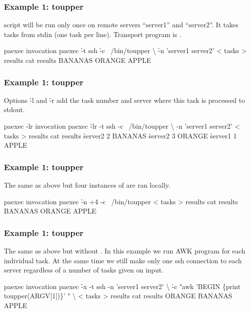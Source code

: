 \documentclass[hyperref={colorlinks=true}]{beamer}
\begin{document}
\begin{frame}[fragile]
  \frametitle{Example 1: toupper}
 script will be run only once on remote servers
``server1'' and ``server2''.  It takes tasks from stdin (one task per
line). Transport program is .
  \begin{block}{}
      \begin{CodeLarge}{paexec invocation}
\prompt{\$} paexec \h{-t} ssh \h{-c} ~/bin/toupper \textbackslash
   \h{-n} 'server1 server2' < tasks > results
\prompt{\$} cat results
 BANANAS
 ORANGE
 APPLE
\prompt{\$}
      \end{CodeLarge}
  \end{block}
\end{frame}

\begin{frame}[fragile]
  \frametitle{Example 1: toupper}
Options \h{-l} and \h{-r} add the task number and server where this
task is processed to stdout.
  \begin{block}{}
      \begin{CodeLarge}{paexec -lr invocation}
\prompt{\$} paexec \h{-lr} -t ssh -c ~/bin/toupper \textbackslash
   -n 'server1 server2' < tasks > results
\prompt{\$} cat results
\h{server2 2}  BANANAS
\h{server2 3}  ORANGE
\h{server1 1}  APPLE
\prompt{\$}
      \end{CodeLarge}
  \end{block}
\end{frame}


\begin{frame}[fragile]
  \frametitle{Example 1: toupper}
The same as above but four instances of  are ran locally.
  \begin{block}{}
      \begin{CodeLarge}{paexec invocation}
\prompt{\$} paexec \h{-n} +4 -c ~/bin/toupper
   < tasks > results
\prompt{\$} cat results
BANANAS
ORANGE
APPLE
\prompt{\$}
      \end{CodeLarge}
  \end{block}
\end{frame}


\begin{frame}[fragile]
  \frametitle{Example 1: toupper}
The same as above but without .  In this example we
run AWK program for each individual task.  At the same time we still
make only one ssh connection to each server regardless of a number of
tasks given on input.
  \begin{block}{}
      \begin{CodeLarge}{paexec invocation}
\prompt{\$} paexec \h{-x} -t ssh -n 'server1 server2' \textbackslash
\h{-c} "awk 'BEGIN \{print toupper(ARGV[1])\}' " \textbackslash
    < tasks > results
\prompt{\$} cat results
ORANGE
BANANAS
APPLE
\prompt{\$}
      \end{CodeLarge}
  \end{block}
\end{frame}
\end{document}
